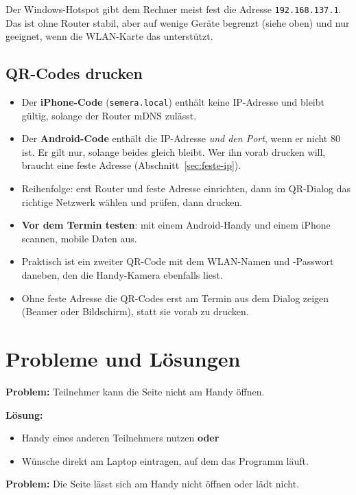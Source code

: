 \documentclass[a4paper,11pt]{article}
\begin{document}
Der Windows-Hotspot gibt dem Rechner meist fest die Adresse \texttt{192.168.137.1}. Das ist ohne Router stabil, aber auf
wenige Geräte begrenzt (siehe oben) und nur geeignet, wenn die WLAN-Karte das unterstützt.

\subsection{QR-Codes drucken}

\begin{itemize}
  \item Der \textbf{iPhone-Code} (\texttt{semera.local}) enthält keine IP-Adresse und bleibt gültig, solange der Router
  mDNS zulässt.
  \item Der \textbf{Android-Code} enthält die IP-Adresse \emph{und den Port}, wenn er nicht 80 ist. Er gilt nur, solange
  beides gleich bleibt. Wer ihn vorab drucken will, braucht eine feste Adresse (Abschnitt~\ref{sec:feste-ip}).
  \item Reihenfolge: erst Router und feste Adresse einrichten, dann im QR-Dialog das richtige Netzwerk wählen und prüfen,
  dann drucken.
  \item \textbf{Vor dem Termin testen}: mit einem Android-Handy und einem iPhone scannen, mobile Daten aus.
  \item Praktisch ist ein zweiter QR-Code mit dem WLAN-Namen und -Passwort daneben, den die Handy-Kamera ebenfalls
  liest.
  \item Ohne feste Adresse die QR-Codes erst am Termin aus dem Dialog zeigen (Beamer oder Bildschirm), statt sie vorab zu
  drucken.
\end{itemize}

\section{Probleme und Lösungen}\label{sec:probleme}

\textbf{Problem:} Teilnehmer kann die Seite nicht am Handy öffnen.

\textbf{Lösung:}\par\nopagebreak
\begin{itemize}
  \item Handy eines anderen Teilnehmers nutzen \textbf{oder}
  \item Wünsche direkt am Laptop eintragen, auf dem das Programm läuft.
\end{itemize}

\textbf{Problem:} Die Seite lässt sich am Handy nicht öffnen oder lädt nicht.
\end{document}
